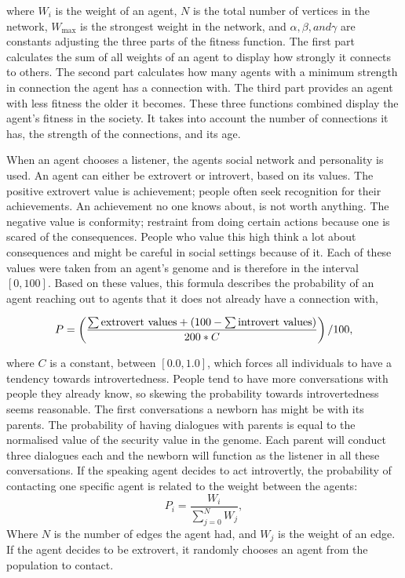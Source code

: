 where $W_{i}$ is the weight of an agent, $N$ is the total number of vertices in the network, $W_{\text{max}}$ is the strongest weight in the network, and $\alpha, \beta, and \gamma$ are constants adjusting the three parts of the fitness function. The first part calculates the sum of all weights of an agent to display how strongly it connects to others. The second part calculates how many agents with a minimum strength in connection the agent has a connection with. The third part provides an agent with less fitness the older it becomes. These three functions combined display the agent’s fitness in the society. It takes into account the number of connections it has, the strength of the connections, and its age.

When an agent chooses a listener, the agents social network and personality is used. An agent can either be extrovert or introvert, based on its values. The positive extrovert value is achievement; people often seek recognition for their achievements. An achievement no one knows about, is not worth anything. The negative value is conformity; restraint from doing certain actions because one is scared of the consequences. People who value this high think a lot about consequences and might be careful in social settings because of it. Each of these values were taken from an agent’s genome and is therefore in the interval $[0, 100]$. Based on these values, this formula describes the probability of an agent reaching out to agents that it does not already have a connection with,

\begin{equation}\label{eq:chooseListener}
P = \left( \frac{\sum \text{extrovert values} + (100 - \sum \text{introvert values})}{200\ast C} \right)/100,
\end{equation}

where $C$ is a constant, between $[0.0, 1.0]$, which forces all individuals to have a tendency towards introvertedness. People tend to have more conversations with people they already know, so skewing the probability towards introvertedness seems reasonable. The first conversations a newborn has might be with its parents. The probability of having dialogues with parents is equal to the normalised value of the security value in the genome. Each parent will conduct three dialogues each and the newborn will function as the listener in all these conversations. If the speaking agent decides to act introvertly, the probability of contacting one specific agent is related to the weight between the agents:
\begin{equation}\label{eq:intrvertListener}
P_{i} = \frac{W_{i}}{\sum_{j=0}^{N}{W_{j}}},
\end{equation}
Where $N$ is the number of edges the agent had, and $W_{j}$ is the weight of an edge. If the agent decides to be extrovert, it randomly chooses an agent from the population to contact.

